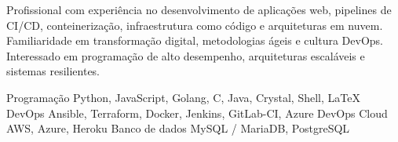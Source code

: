 \documentclass[9pt]{developercv} %
\begin{document}

\begin{minipage}[t]{0.40\textwidth}
	\vspace{-\baselineskip} %

    {\small{
        Profissional com experiência no desenvolvimento de aplicações web,
        pipelines de CI/CD, conteinerização, infraestrutura como código e
        arquiteturas em nuvem. Familiaridade em transformação digital,
        metodologias ágeis e cultura DevOps. Interessado em programação de alto
        desempenho, arquiteturas escaláveis e sistemas resilientes.
    }}
\end{minipage}
\hfill
\begin{minipage}[t]{0.65\textwidth}
	\vspace{-\baselineskip} %

    \begin{skillset}
        \skill
            {Programação}
            {Python, JavaScript, Golang, C, Java, Crystal, Shell, {\LaTeX}}
        \skill
            {DevOps}
            {Ansible, Terraform, Docker, Jenkins, GitLab-CI, Azure DevOps}
        \skill
            {Cloud}
            {AWS, Azure, Heroku}
        \skill
            {Banco de dados}
            {MySQL / MariaDB, PostgreSQL}
    \end{skillset}

\end{minipage}

\vspace{0.3cm}


\end{document}
